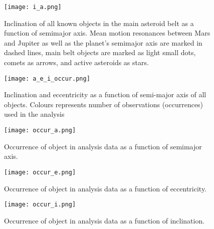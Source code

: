 \documentclass[iop,apj]{emulateapj}
\begin{document}




\begin{figure}[!htb]
    \centering
    \texttt{[image: i\_a.png]}
    \caption{Inclination of all known objects in the main asteroid belt as a function of semimajor axis.  Mean motion resonances between Mars and Jupiter as well as the planet's semimajor axis are marked in dashed lines, main belt objects are marked as light small dots, comets as arrows, and active asteroids as stars. \cite{mpc}}\label{fig:1}
\end{figure}

\begin{figure}[!htb]
    \centering
    \texttt{[image: a\_e\_i\_occur.png]}
    \caption{Inclination and eccentricity as a function of semi-major axis of all objects. Colours represents number of observations (occurrences) used in the analysis}\label{fig:2}
\end{figure}

\begin{figure}[!htb]
    \centering
    \texttt{[image: occur\_a.png]}
    \caption{Occurrence of object in analysis data as a function of semimajor axis. }\label{fig:3}
\end{figure}

\begin{figure}[!htb]
    \centering
    \texttt{[image: occur\_e.png]}
    \caption{Occurrence of object in analysis data as a function of eccentricity. }\label{fig:4}
\end{figure}

\begin{figure}[!htb]
    \centering
    \texttt{[image: occur\_i.png]}
    \caption{Occurrence of object in analysis data as a function of inclination. }\label{fig:5}
\end{figure}
\end{document}
